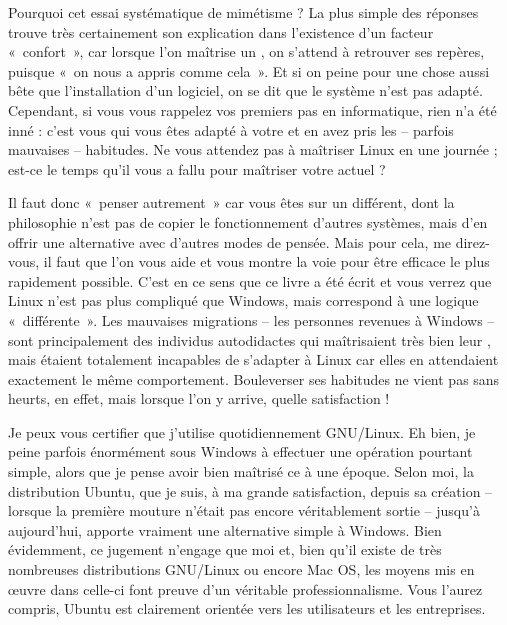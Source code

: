 Pourquoi cet essai systématique de mimétisme ? La plus simple des réponses trouve très certainement son explication dans l'existence d'un facteur «~confort~», car lorsque l'on maîtrise un , on s'attend à retrouver ses repères, puisque «~on nous a appris comme cela~». Et si on peine pour une chose aussi bête que l'installation d'un logiciel, on se dit que le système n'est pas adapté. Cependant, si vous vous rappelez vos premiers pas en informatique, rien n'a été inné : c'est vous qui vous êtes adapté à votre  et en avez pris les -- parfois mauvaises -- habitudes. Ne vous attendez pas à maîtriser Linux en une journée ; est-ce le temps qu'il vous a fallu pour maîtriser votre  actuel ?\par
Il faut donc «~penser autrement~» car vous êtes sur un  différent, dont la philosophie n'est pas de copier le fonctionnement d'autres systèmes, mais d'en offrir une alternative avec d'autres modes de pensée. Mais pour cela, me direz-vous, il faut que l'on vous aide et vous montre la voie pour être efficace le plus rapidement possible. C'est en ce sens que ce livre a été écrit et vous verrez que Linux n'est pas plus compliqué que Windows, mais correspond à une logique «~différente~». Les mauvaises migrations -- les personnes revenues à Windows -- sont principalement des individus autodidactes qui maîtrisaient très bien leur , mais étaient totalement incapables de s'adapter à Linux car elles en attendaient exactement le même comportement. Bouleverser ses habitudes ne vient pas sans heurts, en effet, mais lorsque l'on y arrive, quelle satisfaction !\par
Je peux vous certifier que j'utilise quotidiennement GNU/Linux. Eh bien, je peine parfois énormément sous Windows à effectuer une opération pourtant simple, alors que je pense avoir bien maîtrisé ce  à une époque. Selon moi, la distribution Ubuntu, que je suis, à ma grande satisfaction, depuis sa création -- lorsque la première mouture n'était pas encore véritablement sortie -- jusqu'à aujourd'hui, apporte vraiment une alternative simple à Windows. Bien évidemment, ce jugement n'engage que moi et, bien qu'il existe de très nombreuses distributions GNU/Linux ou encore Mac OS, les moyens mis en œuvre dans celle-ci font preuve d'un véritable professionnalisme. Vous l'aurez compris, Ubuntu est clairement orientée vers les utilisateurs et les entreprises.\par

